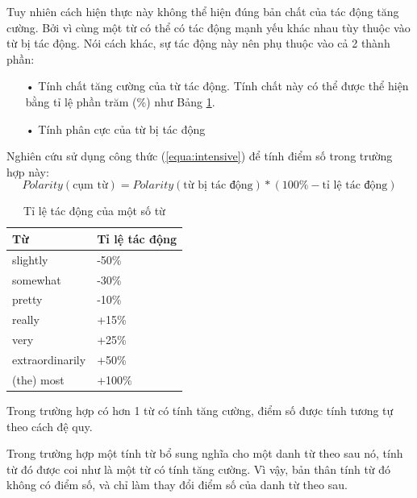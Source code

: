 Tuy nhiên cách hiện thực này không thể hiện đúng bản chất của tác động tăng cường. Bởi vì cùng một từ  có thể có tác động mạnh yếu khác nhau tùy thuộc vào từ bị tác động. Nói cách khác, sự tác động này nên phụ thuộc vào cả 2 thành phần: 
\begin{itemize}
\item[•] Tính chất tăng cường của từ tác động. Tính chất này có thể được thể hiện bằng tỉ lệ phần trăm (\%) như Bảng \ref{table:intensive}.
\item[•] Tính phân cực của từ bị tác động
\end{itemize}
Nghiên cứu \cite{taboada2011lexicon} sử dụng công thức (\ref{equa:intensive}) để tính điểm số trong trường hợp này:
\begin{equation}
\label{equa:intensive}
Polarity (\text{cụm từ}) = Polarity(\text{từ bị tác động}) * (100\% - \text{tỉ lệ tác động})
\end{equation}
\begin{table}[H]
\caption{Tỉ lệ tác động của một số từ} \label{table:intensive}
\begin{tabular}{l l}
\hline
\textbf{Từ} & \textbf{Tỉ lệ tác động} 
\\ \hline
slightly & -50\%
\\ 
somewhat & -30\%
\\ 
pretty & -10\%
\\ 
really & +15\%
\\ 
very & +25\%
\\ 
extraordinarily & +50\%
\\
(the) most & +100\%
\\ \hline
\end{tabular}
\end{table}
Trong trường hợp có hơn 1 từ có tính tăng cường, điểm số được tính tương tự theo cách đệ quy. \\

Trong trường hợp một tính từ bổ sung nghĩa cho một danh từ theo sau nó, tính từ đó được coi như là một từ có tính tăng cường. Vì vậy, bản thân tính từ đó không có điểm số, và chỉ làm thay đổi điểm số của danh từ theo sau. \\

